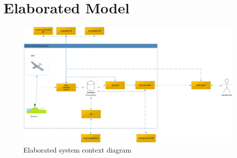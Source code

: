 \section{Elaborated Model}

\begin{figure}[H]
\centering
\includegraphics[keepaspectratio=true,width=1\textwidth]{Diagrams/Model/Model_v2.jpg}
\caption{Elaborated system context diagram}
\label{fig:system-context-diagram}
\end{figure}